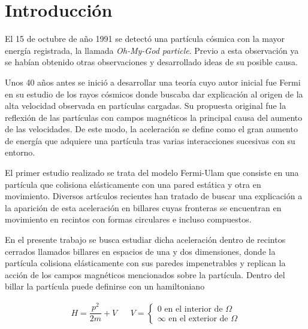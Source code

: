 %
%
%
\chapter{Introducción}

El 15 de octubre de año 1991 se detectó una partícula cósmica con la mayor energía registrada, la llamada \textit{Oh-My-God particle}\cite{OhMyParticle}. Previo a esta observación ya se habían obtenido otras observaciones y desarrollado ideas de su posible causa.

\vspace{3mm}

Unos 40 años antes se inició a desarrollar una teoría cuyo autor inicial fue Fermi \cite{Fermi} en su estudio de los rayos cósmicos donde buscaba dar explicación al origen de la alta velocidad observada en partículas cargadas. Su propuesta original fue la reflexión de las partículas con campos magnéticos la principal causa del aumento de las velocidades. De este modo, la aceleración se define como el gran aumento de energía que adquiere una partícula tras varias interacciones sucesivas con su entorno. 

\vspace{3mm}

El primer estudio realizado se trata del modelo Fermi-Ulam \cite{FermiUlam} que consiste en una partícula que colisiona elásticamente con una pared estática y otra en movimiento. Diversos artículos recientes han tratado de buscar una explicación a la aparición de esta aceleración en billares cuyas fronteras se encuentran en movimiento \cite{EnergyDifussion,SuppressingFermi, SuppressingFermi2, ReferenciaProfe, NonAutonomous, ExponentialEnergy, GeneralBilliard, GeneralBilliard2} en recintos con formas circulares e incluso compuestos. 

\vspace{3mm}

En el presente trabajo se busca estudiar dicha aceleración dentro de recintos cerrados llamados billares en espacios de una y dos dimensiones, donde la partícula colisiona elásticamente con sus paredes impenetrables y replican la acción de los campos magnéticos mencionados sobre la partícula. Dentro del billar la partícula puede definirse con un hamiltoniano

\begin{align}
    H = \dfrac{p^2}{2m} + V & & V = \begin{cases}
        0 \text{ en el interior de } \Omega \\
        \infty \text{ en el exterior de } \Omega
    \end{cases}
\end{align}


